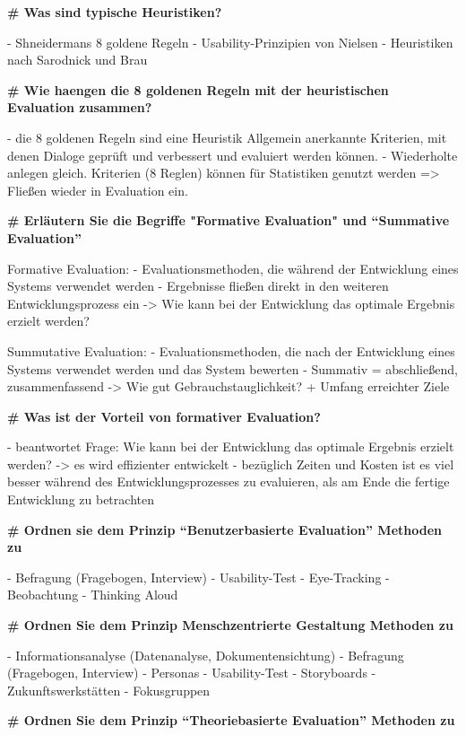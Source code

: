\documentclass{article}
\begin{document}
\begin{multicols}{3}
\begin{flushleft}
\begin{tiny}
			\textbf{\# Was sind typische Heuristiken?}

			- Shneidermans 8 goldene Regeln
			- Usability-Prinzipien von Nielsen
			- Heuristiken nach Sarodnick und Brau

			\textbf{\# Wie haengen die 8 goldenen Regeln mit der heuristischen
				Evaluation zusammen?}

			- die 8 goldenen Regeln sind eine Heuristik Allgemein anerkannte
			  Kriterien, mit denen Dialoge geprüft und verbessert und evaluiert
			  werden können.
			- Wiederholte anlegen gleich. Kriterien (8 Reglen) können für
			  Statistiken genutzt werden => Fließen wieder in Evaluation ein.

			\textbf{\# Erläutern Sie die Begriffe "Formative Evaluation" und
				``Summative Evaluation''}

			Formative Evaluation:
			- Evaluationsmethoden, die während der Entwicklung eines Systems
			  verwendet werden
			- Ergebnisse fließen direkt in den weiteren Entwicklungsprozess ein
			  -> Wie kann bei der Entwicklung das optimale Ergebnis erzielt
			  werden?

			Summutative Evaluation:
			- Evaluationsmethoden, die nach der Entwicklung eines Systems
			  verwendet werden und das System bewerten
			- Summativ = abschließend, zusammenfassend -> Wie gut
			  Gebrauchstauglichkeit? + Umfang erreichter Ziele

			\textbf{\# Was ist der Vorteil von formativer Evaluation?}

			- beantwortet Frage: Wie kann bei der Entwicklung das optimale
			  Ergebnis erzielt werden? -> es wird effizienter entwickelt
			- bezüglich Zeiten und Kosten ist es viel besser während des
			  Entwicklungsprozesses zu evaluieren, als am Ende die fertige
			  Entwicklung zu betrachten

			\textbf{\# Ordnen sie dem Prinzip ``Benutzerbasierte Evaluation''
				Methoden zu}

			- Befragung (Fragebogen, Interview) - Usability-Test - Eye-Tracking
			- Beobachtung - Thinking Aloud

			\textbf{\# Ordnen Sie dem Prinzip Menschzentrierte Gestaltung
				Methoden zu}

			- Informationsanalyse (Datenanalyse, Dokumentensichtung)
			- Befragung (Fragebogen, Interview)
			- Personas
			- Usability-Test
			- Storyboards
			- Zukunftswerkstätten
			- Fokusgruppen

			\textbf{\# Ordnen Sie dem Prinzip ``Theoriebasierte Evaluation''
				Methoden zu}


\end{tiny}
\end{flushleft}
\end{multicols}
\end{document}
